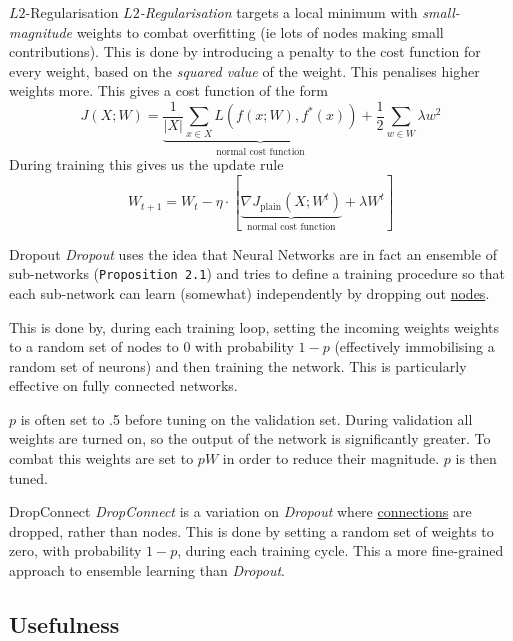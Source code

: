 \documentclass[11pt,a4paper]{article}
\begin{document}
  \begin{definition}{$L2$-Regularisation}
    \textit{$L2$-Regularisation} targets a local minimum with \textit{small-magnitude} weights to combat overfitting (ie lots of nodes making small contributions). This is done by introducing a penalty to the cost function for every weight, based on the \textit{squared value} of the weight. This penalises higher weights more. This gives a cost function of the form
    \[ J(X;W)=\underbrace{\frac1{|X|}\sum_{x\in X}L(f(x;W),f^*(x))}_\text{normal cost function}+\frac12\sum_{w\in W}\lambda w^2 \]
    During training this gives us the update rule
    \[ W_{t+1}=W_t-\eta\cdot\left[\underbrace{\nabla J_\text{plain}(X;W^t)}_\text{normal cost function}+\lambda W^t\right] \]
  \end{definition}

  \begin{definition}{Dropout}
    \textit{Dropout} uses the idea that Neural Networks are in fact an ensemble of sub-networks (\texttt{Proposition 2.1}) and tries to define a training procedure so that each sub-network can learn (somewhat) independently by dropping out \underline{nodes}.
    \par This is done by, during each training loop, setting the incoming weights weights to a random set of nodes to 0 with probability $1-p$ (effectively immobilising a random set of neurons) and then training the network. This is particularly effective on fully connected networks.
    \par $p$ is often set to .5 before tuning on the validation set. During validation all weights are turned on, so the output of the network is significantly greater. To combat this weights are set to $pW$ in order to reduce their magnitude. $p$ is then tuned.
  \end{definition}

  \begin{definition}{DropConnect}
    \textit{DropConnect} is a variation on \textit{Dropout} where \underline{connections} are dropped, rather than nodes. This is done by setting a random set of weights to zero, with probability $1-p$, during each training cycle. This a more fine-grained approach to ensemble learning than \textit{Dropout}.
  \end{definition}

\subsection{Usefulness}
\end{document}
